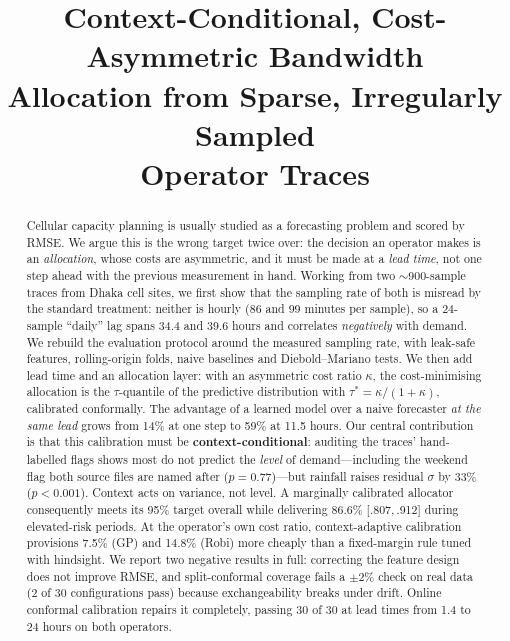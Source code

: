 \documentclass[conference]{IEEEtran}
\newcommand{\gpx}{GP}
\newcommand{\robix}{Robi}
\begin{document}
\title{Context-Conditional, Cost-Asymmetric Bandwidth\\ Allocation from Sparse, Irregularly Sampled\\ Operator Traces}

\author{
}

\maketitle

\begin{abstract}
Cellular capacity planning is usually studied as a forecasting problem and scored by
RMSE. We argue this is the wrong target twice over: the decision an operator makes is
an \emph{allocation}, whose costs are asymmetric, and it must be made at a \emph{lead
time}, not one step ahead with the previous measurement in hand. Working from two
$\sim$900-sample traces from Dhaka cell sites, we first show that the sampling rate of
both is misread by the standard treatment: neither is hourly (86 and 99 minutes per
sample), so a 24-sample ``daily'' lag spans 34.4 and 39.6 hours and correlates
\emph{negatively} with demand. We rebuild the evaluation protocol around the measured
sampling rate, with leak-safe features, rolling-origin folds, naive baselines and
Diebold--Mariano tests. We then add lead time and an allocation layer: with an
asymmetric cost ratio $\kappa$, the cost-minimising allocation is the $\tau$-quantile
of the predictive distribution with $\tau^{*}=\kappa/(1+\kappa)$, calibrated
conformally. The advantage of a learned model over a naive forecaster \emph{at the same
lead} grows from 14\% at one step to 59\% at 11.5 hours. Our central contribution is
that this calibration must be \textbf{context-conditional}: auditing the traces'
hand-labelled flags shows most do not predict the \emph{level} of demand---including
the weekend flag both source files are named after ($p=0.77$)---but rainfall raises
residual $\sigma$ by 33\% ($p<0.001$). Context acts on variance, not level. A
marginally calibrated allocator consequently meets its 95\% target overall while
delivering 86.6\% [.807,\,.912] during elevated-risk periods. At the operator's own
cost ratio, context-adaptive calibration provisions 7.5\% (\gpx) and 14.8\% (\robix)
more cheaply than a fixed-margin rule tuned with hindsight. We report two negative
results in full: correcting the feature design does not improve RMSE, and
split-conformal coverage fails a $\pm 2\%$ check on real data (2 of 30 configurations
pass) because exchangeability breaks under drift. Online conformal calibration repairs
it completely, passing 30 of 30 at lead times from 1.4 to 24 hours on both operators.
\end{abstract}
\end{document}
